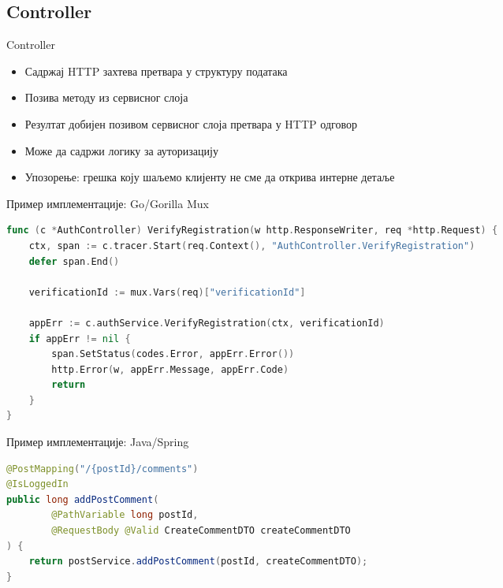 \documentclass[aspectratio=169]{beamer}
\begin{document}
    \subsection[]{Controller}
    
    \begin{frame}{Controller}
        \begin{itemize}
            \item Садржај HTTP захтева претвара у структуру података
            \item Позива методу из сервисног слоја
            \item Резултат добијен позивом сервисног слоја претвара у HTTP одговор
            \item Може да садржи логику за ауторизацију
            \item Упозорење: грешка коју шаљемо клијенту не сме да открива интерне детаље
        \end{itemize}
    \end{frame}
    
    \begin{frame}[fragile]{Пример имплементације: Go/Gorilla Mux}
        \begin{adjustbox}{width=\textwidth,height=\textheight,keepaspectratio}
            \begin{lstlisting}[language=go]
func (c *AuthController) VerifyRegistration(w http.ResponseWriter, req *http.Request) {
    ctx, span := c.tracer.Start(req.Context(), "AuthController.VerifyRegistration")
    defer span.End()

    verificationId := mux.Vars(req)["verificationId"]

    appErr := c.authService.VerifyRegistration(ctx, verificationId)
    if appErr != nil {
        span.SetStatus(codes.Error, appErr.Error())
        http.Error(w, appErr.Message, appErr.Code)
        return
    }
}
            \end{lstlisting}
        \end{adjustbox}
    \end{frame}
    
    \begin{frame}[fragile]{Пример имплементације: Java/Spring}
        \begin{adjustbox}{width=\textwidth,height=\textheight,keepaspectratio}
            \begin{lstlisting}[language=java]
@PostMapping("/{postId}/comments")
@IsLoggedIn
public long addPostComment(
        @PathVariable long postId,
        @RequestBody @Valid CreateCommentDTO createCommentDTO
) {
    return postService.addPostComment(postId, createCommentDTO);
}

            \end{lstlisting}
        \end{adjustbox}
    \end{frame}
    
\end{document}
